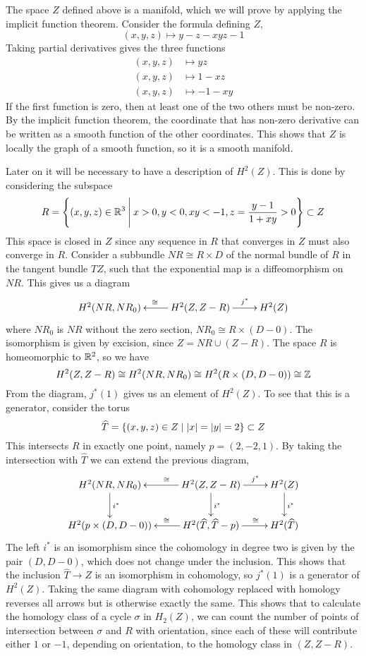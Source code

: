 The space $Z$ defined above is a manifold, which we will prove by
applying the implicit function theorem. Consider the formula defining
$Z$,
\[ (x,y,z) \mapsto y-z-xyz-1 \]
Taking partial derivatives gives the three functions
\begin{align*}
  (x,y,z) &\mapsto yz \\
  (x,y,z) &\mapsto 1-xz \\
  (x,y,z) &\mapsto -1-xy
\end{align*}
If the first function is zero, then at least one of the two others
must be non-zero. By the implicit function theorem, the coordinate
that has non-zero derivative can be written as a smooth function of
the other coordinates. This shows that $Z$ is locally the graph of a
smooth function, so it is a smooth manifold.

Later on it will be necessary to have a description of $H^2(Z)$. This
is done by considering the subspace
\[ R = \left\{ (x,y,z) \in \mathbb{R}^3 \:\Bigg\vert\: x > 0, y < 0, xy < -1, z =
  \frac{y-1}{1+xy}>0  \right\} \subset Z \]
This space is closed in $Z$ since any sequence in $R$ that converges
in $Z$ must also converge in $R$.
Consider a subbundle $NR \cong R\times D$ of the normal bundle of $R$
in the tangent bundle $TZ$, such that the exponential map is a
diffeomorphism on $NR$. This gives us a diagram
\[ \xymatrix{ H^2(NR,NR_0) & H^2(Z,Z-R) \ar[l]_\cong \ar[r]^>>>>>{j^*} &
  H^2(Z) } \]
where $NR_0$ is $NR$ without the zero section, $NR_0 \cong
R\times(D-0)$. The isomorphism is given by excision, since $Z = NR
\cup (Z-R)$. The space $R$ is homeomorphic to $\mathbb{R}^2$, so we have 
\[ H^2(Z,Z-R) \cong H^2(NR,NR_0) \cong H^2(R\times (D,D-0)) \cong
\mathbb{Z} \] 
From the diagram, $j^*(1)$ gives us an element of $H^2(Z)$. To see
that this is a generator, consider the torus 
\[ \widehat T = \left\{ (x,y,z)\in Z \mid \left| x \right| = \left| y \right| = 2  \right\}
\subset Z \]
This intersects $R$ in exactly one point, namely $p=(2,-2,1)$. By
taking the intersection with $\widehat T$ we can extend the previous
diagram,
\[ \xymatrix{ H^2(NR,NR_0) \ar[d]^{i^*} & H^2(Z,Z-R) \ar[d]^{i^*}
  \ar[l]_<<<<<\cong \ar[r]^>>>>>{j^*} & H^2(Z) \ar[d]^{i^*} \\
  H^2(p\times (D,D-0)) & H^2(\widehat T,\widehat T-p)
  \ar[r]^>>>>>{\cong} \ar[l]_>>>>>\cong & H^2(\widehat T) 
} \]
The left $i^*$ is an isomorphism since the cohomology in degree two is
given by the pair $(D,D-0)$, which does not change under the
inclusion. This shows that the inclusion $\widehat T \to Z$ is an
isomorphism in cohomology, so $j^*(1)$ is a generator of
$H^2(Z)$. Taking the same diagram with cohomology replaced with
homology reverses all arrows but is otherwise exactly the same. This
shows that to calculate the homology class of a cycle $\sigma$ in
$H_2(Z)$, we can count the number of points of intersection between
$\sigma$ and $R$ with orientation, since each of these will contribute
either $1$ or $-1$, depending on orientation, to the homology class in
$(Z,Z-R)$.

